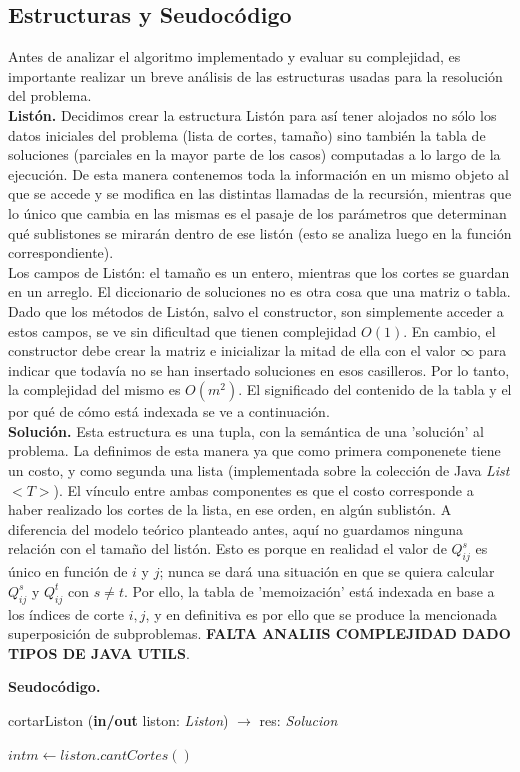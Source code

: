 \subsection{Estructuras y Seudocódigo}

Antes de analizar el algoritmo implementado y evaluar su complejidad, es importante realizar un breve análisis de las estructuras usadas para la resolución del problema.\\

\textbf{Listón.} Decidimos crear la estructura Listón para así tener alojados no sólo los datos iniciales del problema (lista de cortes, tamaño) sino también la tabla de soluciones (parciales en la mayor parte de los casos) computadas a lo largo de la ejecución. De esta manera contenemos toda la información en un mismo objeto al que se accede y se modifica en las distintas llamadas de la recursión, mientras que lo único que cambia en las mismas es el pasaje de los parámetros que determinan qué sublistones se mirarán dentro de ese listón (esto se analiza luego en la función correspondiente).\\
\indent Los campos de Listón: el tamaño es un entero, mientras que los cortes se guardan en un arreglo. El diccionario de soluciones no es otra cosa que una matriz o tabla. Dado que los métodos de Listón, salvo el constructor, son simplemente acceder a estos campos, se ve sin dificultad que tienen complejidad $O(1)$. En cambio, el constructor debe crear la matriz e inicializar la mitad de ella con el valor $\infty$ para indicar que todavía no se han insertado soluciones en esos casilleros. Por lo tanto, la complejidad del mismo es $O(m^2)$. El significado del contenido de la tabla y el por qué de cómo está indexada se ve a continuación.\\

\textbf{Solución.} Esta estructura es una tupla, con la semántica de una 'solución' al problema. La definimos de esta manera ya que como primera componenete tiene un costo, y como segunda una lista (implementada sobre la colección de Java \textsl{List$<T>$}). El vínculo entre ambas componentes es que el costo corresponde a haber realizado los cortes de la lista, en ese orden, en algún sublistón. A diferencia del modelo teórico planteado antes, aquí no guardamos ninguna relación con el tamaño del listón. Esto es porque en realidad el valor de $Q^{s}_{ij}$ es único en función de $i$ y $j$; nunca se dará una situación en que se quiera calcular $Q^{s}_{ij}$ y $Q^{t}_{ij}$ con $ s \neq t$. Por ello, la tabla de 'memoización' está indexada en base a los índices de corte $i,j$, y en definitiva es por ello que se produce la mencionada superposición de subproblemas. \textbf{FALTA ANALIIS COMPLEJIDAD DADO TIPOS DE JAVA UTILS}.

\textbf{Seudocódigo.}

\begin{algorithm}
\caption{cortarListon (\textbf{in/out} liston: \textsl{Liston}) $\rightarrow$ res: \textsl{Solucion}}
\begin{algorithmic}

\STATE $int m \leftarrow liston.cantCortes()$

\end{algorithmic}
\end{algorithm}
	
